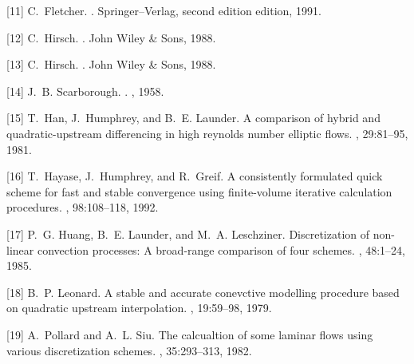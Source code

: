 \documentclass[handout]{beamer}
\begin{document}
\begin{frame}[allowframebreaks]
\begin{thebibliography}{10}
[11]  C.~Fletcher.
  .
  \newblock Springer--Verlag, second edition edition, 1991.
  
[12]  C.~Hirsch.
  .
  \newblock John Wiley \& Sons, 1988.
  
[13]  C.~Hirsch.
  .
  \newblock John Wiley \& Sons, 1988.
   

[14]   J.~B. Scarborough.
   .
   , 1958.

    \beamertemplatearticlebibitems
    
[15]    T.~Han, J.~Humphrey, and B.~E. Launder.
    \newblock A comparison of hybrid and quadratic-upstream differencing in high
    reynolds number elliptic flows.
    , 29:81--95, 1981.
    
[16]   T.~Hayase, J.~Humphrey, and R.~Greif.
   \newblock A consistently formulated quick scheme for fast and stable
   convergence using finite-volume iterative calculation procedures.
   , 98:108--118, 1992.

[17]   P.~G. Huang, B.~E. Launder, and M.~A. Leschziner.
   \newblock Discretization of non-linear convection processes: A broad-range
   comparison of four schemes.
   , 48:1--24, 1985.

[18]   B.~P. Leonard.
   \newblock A stable and accurate conevctive modelling procedure based on
   quadratic upstream interpolation.
   , 19:59--98, 1979.
  
[19]   A.~Pollard and A.~L. Siu.
   \newblock The calcualtion of some laminar flows using various discretization
   schemes.
   , 35:293--313, 1982.
   
  \end{thebibliography}
\end{frame}
\end{document}
